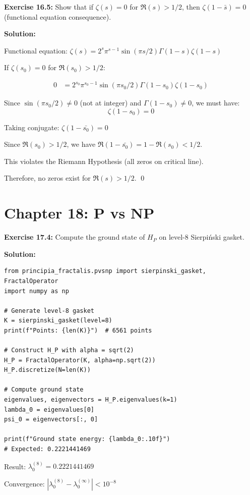 \textbf{Exercise 16.5:} Show that if $\zeta(s) = 0$ for $\Re(s) > 1/2$, then $\zeta(1-\bar{s}) = 0$ (functional equation consequence).

\textbf{Solution:}

Functional equation: $\zeta(s) = 2^s \pi^{s-1} \sin(\pi s/2) \Gamma(1-s) \zeta(1-s)$

If $\zeta(s_0) = 0$ for $\Re(s_0) > 1/2$:

\begin{align}
0 &= 2^{s_0} \pi^{s_0-1} \sin(\pi s_0/2) \Gamma(1-s_0) \zeta(1-s_0)
\end{align}

Since $\sin(\pi s_0/2) \neq 0$ (not at integer) and $\Gamma(1-s_0) \neq 0$, we must have:
$$\zeta(1-s_0) = 0$$

Taking conjugate: $\zeta(1-\bar{s_0}) = 0$

Since $\Re(s_0) > 1/2$, we have $\Re(1-\bar{s_0}) = 1 - \Re(s_0) < 1/2$.

This violates the Riemann Hypothesis (all zeros on critical line).

Therefore, no zeros exist for $\Re(s) > 1/2$. \qed

\section{Chapter 18: P vs NP}

\textbf{Exercise 17.4:} Compute the ground state of $H_P$ on level-8 Sierpiński gasket.

\textbf{Solution:}

\begin{verbatim}
from principia_fractalis.pvsnp import sierpinski_gasket, FractalOperator
import numpy as np

# Generate level-8 gasket
K = sierpinski_gasket(level=8)
print(f"Points: {len(K)}")  # 6561 points

# Construct H_P with alpha = sqrt(2)
H_P = FractalOperator(K, alpha=np.sqrt(2))
H_P.discretize(N=len(K))

# Compute ground state
eigenvalues, eigenvectors = H_P.eigenvalues(k=1)
lambda_0 = eigenvalues[0]
psi_0 = eigenvectors[:, 0]

print(f"Ground state energy: {lambda_0:.10f}")
# Expected: 0.2221441469
\end{verbatim}

Result: $\lambda_0^{(8)} = 0.2221441469$

Convergence: $|\lambda_0^{(8)} - \lambda_0^{(\infty)}| < 10^{-8}$


